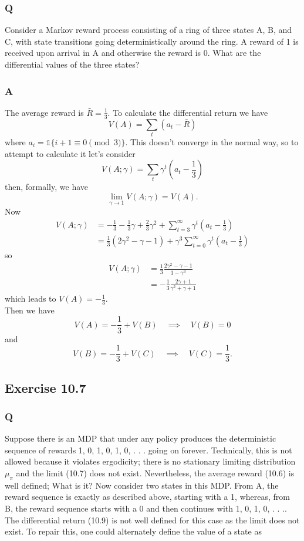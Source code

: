 \subsubsection{Q}
Consider a Markov reward process consisting of a ring of three states A, B, and C, with state transitions going deterministically around the ring. A reward of 1 is received upon arrival in A and otherwise the reward is 0. What are the differential values of the three states?
\subsubsection{A}
The average reward is $\bar{R} = \frac13$. To calculate the differential return we have 
\[
    V(A) = \sum_t (a_t - \bar{R})
\]
where $a_i = \mathds{1}\{i + 1 \equiv 0 \pmod 3\}$. This doesn't converge in the normal way, so to attempt to calculate it let's consider
\[
    V(A; \gamma) = \sum_t \gamma^t \left( a_t - \frac13\right)
\]
then, formally, we have
\[
    \lim_{\gamma \to 1} V(A; \gamma) = V(A).
\]
Now 
\begin{align*}
    V(A; \gamma) &= - \frac13 - \frac13 \gamma  + \frac23 \gamma^2 + \sum_{t=3}^{\infty} \gamma^t \left(a_t - \frac13\right) \\
                 &= \frac13 (2 \gamma^2 - \gamma - 1) + \gamma ^3 \sum_{t=0}^{\infty} \gamma^t \left(a_t - \frac13\right)
\end{align*}
so
\begin{align*}
    V(A; \gamma) &= \frac13 \frac{2 \gamma^2 - \gamma - 1}{1 - \gamma^3} \\
                 &= -\frac13 \frac{2 \gamma + 1}{\gamma^2 + \gamma +1}
\end{align*}
which leads to $V(A) = -\frac13$. \\

Then we have 
\[
    V(A) = -\frac13 + V(B) \quad \implies \quad V(B) = 0
\]
and
\[
    V(B) = -\frac13 + V(C) \quad \implies \quad V(C) = \frac13.
\]

\subsection{Exercise 10.7}
\subsubsection{Q}
Suppose there is an MDP that under any policy produces the deterministic sequence of rewards 1, 0, 1, 0, 1, 0, . . . going on forever. Technically, this is not allowed because it violates ergodicity; there is no stationary limiting distribution $\mu_\pi$ and the limit (10.7) does not exist. Nevertheless, the average reward (10.6) is well defined; What is it? Now consider two states in this MDP. From A, the reward sequence is exactly as described above, starting with a 1, whereas, from B, the reward sequence starts with a 0 and then continues with 1, 0, 1, 0, . . .. The differential return (10.9) is not well defined for this case as the limit does not exist. To repair this, one could alternately define the value of a state as

